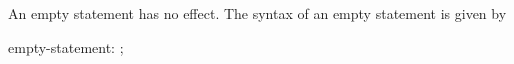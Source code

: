 An empty statement has no effect.  The syntax of an empty statement is
given by
\begin{syntax}
empty-statement:
  ;
\end{syntax}
